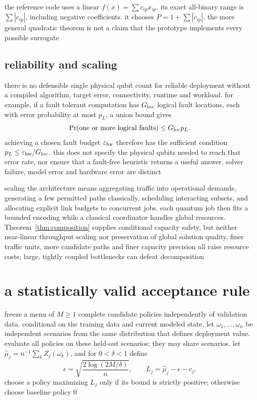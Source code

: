 \documentclass[11pt,a4paper]{article}
\newcommand{\1}{\mathbf{1}}
\begin{document}
the reference code uses a linear $f(x)=\sum c_{ip}x_{ip}$. its exact all-binary range is $\sum|c_{ip}|$, including negative coefficients. it chooses $P=1+\sum|c_{ip}|$. the more general quadratic theorem is not a claim that the prototype implements every possible surrogate

\subsection{reliability and scaling}
there is no defensible single physical qubit count for reliable deployment without a compiled algorithm, target error, connectivity, runtime and workload. for example, if a fault tolerant computation has $G_{\rm loc}$ logical fault locations, each with error probability at most $p_L$, a union bound gives
\begin{equation}
 \Pr(\hbox{one or more logical faults})\le G_{\rm loc}p_L.
\end{equation}
achieving a chosen fault budget $\varepsilon_{\rm hw}$ therefore has the sufficient condition $p_L\le\varepsilon_{\rm hw}/G_{\rm loc}$. this does not specify the physical qubits needed to reach that error rate, nor ensure that a fault-free heuristic returns a useful answer. solver failure, model error and hardware error are distinct

scaling the architecture means aggregating traffic into operational demands, generating a few permitted paths classically, scheduling interacting subsets, and allocating explicit link budgets to concurrent jobs. each quantum job then fits a bounded encoding while a classical coordinator handles global resources. Theorem~\ref{thm:composition} supplies conditional capacity safety, but neither near-linear throughput scaling nor preservation of global solution quality. finer traffic units, more candidate paths and finer capacity precision all raise resource costs; large, tightly coupled bottlenecks can defeat decomposition

\section{a statistically valid acceptance rule}
freeze a menu of $M\ge1$ complete candidate policies independently of validation data. conditional on the training data and current modeled state, let $\omega_1,\ldots,\omega_n$ be independent scenarios from the same distribution that defines deployment value. evaluate all policies on these held-out scenarios; they may share scenarios. let $\widehat\mu_j=n^{-1}\sum_k Z_j(\omega_k)$, and for $0<\delta<1$ define
\begin{equation}
 \epsilon=\sqrt{\frac{2\log(2M/\delta)}{n}},\qquad
 L_j=\widehat\mu_j-\epsilon-c_j.\label{eq:lcb}
\end{equation}
choose a policy maximizing $L_j$ only if its bound is strictly positive; otherwise choose baseline policy 0
\end{document}
